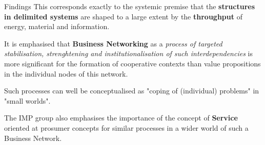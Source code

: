 \documentclass{beamer}
\begin{document}
\begin{frame}{Findings}
This corresponds exactly to the systemic premise that the \textbf{structures
  in delimited systems} are shaped to a large extent by the
\textbf{throughput} of energy, material and information.

It is emphasised that \textbf{Business Networking} as a \emph{process of
  targeted stabilisation, strenghtening and institutionalisation of such
  interdependencies} is more significant for the formation of cooperative
contexts than value propositions in the individual nodes of this network.

Such processes can well be conceptualised as "coping of (individual) problems"
in "small worlds".

The IMP group also emphasises the importance of the concept of
\textbf{Service} oriented at prosumer concepts for similar processes in a
wider world of such a Business Network.

\end{frame}
\end{document}
